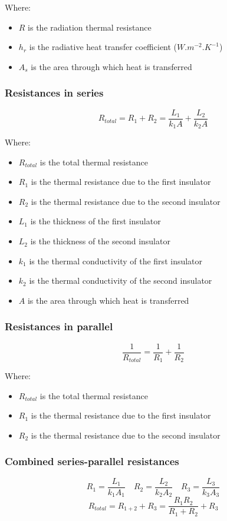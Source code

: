 \documentclass[11pt]{article}
\begin{document}
Where:
\begin{itemize}
\item \(R\) is the radiation thermal resistance
\item \(h_r\) is the radiative heat transfer coefficient (\(\unit{W.m^{-2}.K^{-1}}\))
\item \(A_s\) is the area through which heat is transferred
\end{itemize}
\subsubsection{Resistances in series}
\label{sec:orgbe58cbd}
\[R_{total} = R_1 + R_2 = \frac{L_1}{k_1 A} + \frac{L_2}{k_2 A}\]

Where:
\begin{itemize}
\item \(R_{total}\) is the total thermal resistance
\item \(R_1\) is the thermal resistance due to the first insulator
\item \(R_2\) is the thermal resistance due to the second insulator
\item \(L_1\) is the thickness of the first insulator
\item \(L_2\) is the thickness of the second insulator
\item \(k_1\) is the thermal conductivity of the first insulator
\item \(k_2\) is the thermal conductivity of the second insulator
\item \(A\) is the area through which heat is transferred
\end{itemize}
\subsubsection{Resistances in parallel}
\label{sec:org44e3536}
\[\frac{1}{R_{total}} = \frac{1}{R_1} + \frac{1}{R_2}\]

Where:
\begin{itemize}
\item \(R_{total}\) is the total thermal resistance
\item \(R_1\) is the thermal resistance due to the first insulator
\item \(R_2\) is the thermal resistance due to the second insulator
\end{itemize}
\subsubsection{Combined series-parallel resistances}
\label{sec:orga5d7a9f}
\[R_1 = \frac{L_1}{k_1 A_1} \quad R_2 = \frac{L_2}{k_2 A_2} \quad R_3 = \frac{L_3}{k_3 A_3}\]
\[R_{total} = R_{1 + 2} + R_3 = \frac{R_1 R_2}{R_1 + R_2} + R_3\]
\end{document}
